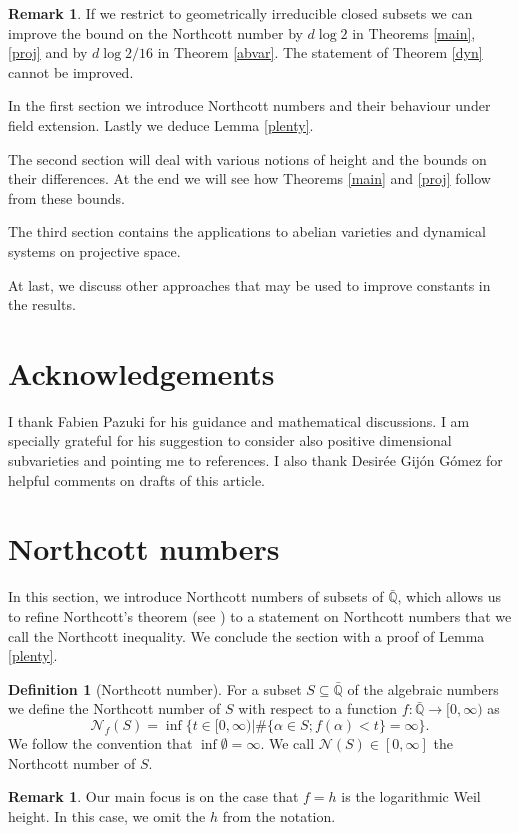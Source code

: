 \documentclass[11pt, a4paper, UKenglish]{amsart}
\newcommand{\N}{\mathcal N}
\newcommand{\Qbar}{\bar{\mathbb{Q}}}
\newcommand{\eqn}[1]{\begin{equation*}#1\end{equation*}}
\theoremstyle{definition}
\newtheorem{def_}[thm_]{Definition}
\newtheorem{rk_}[thm_]{Remark}
\newcommand{\defi}[1]{\begin{def_}#1\end{def_}}
\newcommand{\rk}[1]{\begin{rk_}#1\end{rk_}}
\begin{document}
\rk{If we restrict to geometrically irreducible closed subsets we can improve the bound on the Northcott number by $d\log 2 $ in Theorems \ref{main}, \ref{proj} and by $d\log 2 /16$ in Theorem \ref{abvar}. The statement of Theorem \ref{dyn} cannot be improved.}

In the first section we introduce Northcott numbers and their behaviour under field extension. Lastly we deduce Lemma \ref{plenty}.

The second section will deal with various notions of height and the bounds on their differences. At the end we will see how Theorems \ref{main} and \ref{proj} follow from these bounds.

The third section contains the applications to abelian varieties and dynamical systems on projective space.

At last, we discuss other approaches that may be used to improve constants in the results.

\section*{Acknowledgements}

I thank Fabien Pazuki for his guidance and mathematical discussions. I am specially grateful for his suggestion to consider also positive dimensional subvarieties and pointing me to references. I also thank Desir\'ee Gij\'on G\'omez for helpful comments on drafts of this article.

\section{Northcott numbers}

In this section, we introduce Northcott numbers of subsets of $\Qbar$, which allows us to refine Northcott's theorem (see \cite[Theorem 2.1]{northcott}) to a statement on Northcott numbers that we call the Northcott inequality. We conclude the section with a proof of Lemma \ref{plenty}.

\defi{[Northcott number]For a subset $S \subseteq \Qbar$ of the algebraic numbers we define the Northcott number of $S$ with respect to a function $f: \Qbar \to [0,\infty)$ as
\eqn{\N_f(S) = \inf\{t \in [0,\infty) | \# \{\alpha \in S; f(\alpha)< t\} = \infty\}.}
We follow the convention that $\inf \emptyset = \infty$.
We call $\N(S)\in [0,\infty]$ the Northcott number of $S$.
}

\rk{Our main focus is on the case that $f=h$ is the logarithmic Weil height. In this case, we omit the $h$ from the notation.
}
\end{document}

